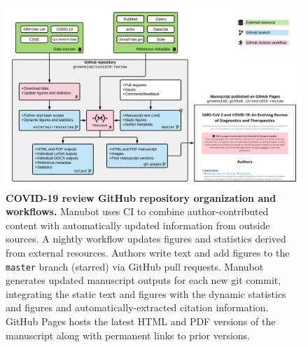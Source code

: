\documentclass[twocolumn]{ceurart}
\begin{document}
\begin{figure}
\hypertarget{fig:manubot-workflow}{%
\centering
\includegraphics{images/covid-19-review-workflow-horizontal.png}
\caption{\textbf{COVID-19 review GitHub repository organization and workflows.}
Manubot uses CI to combine author-contributed content with automatically updated information from outside sources.
A nightly workflow updates figures and statistics derived from external resources.
Authors write text and add figures to the \texttt{master} branch (starred) via GitHub pull requests.
Manubot generates updated manuscript outputs for each new git commit, integrating the static text and figures with the dynamic statistics and figures and automatically-extracted citation information.
GitHub Pages hosts the latest HTML and PDF versions of the manuscript along with permanent links to prior versions.}\label{fig:manubot-workflow}
}
\end{figure}
\end{document}
